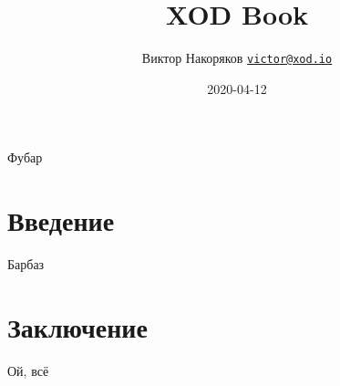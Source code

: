\documentclass[
  fontsize=9pt,
  russian,
]{scrbook}
\title{XOD Book}
\author{Виктор Накоряков
\href{mailto:victor@xod.io}{\nolinkurl{victor@xod.io}}}
\date{2020-04-12}
\begin{document}
\frontmatter
\maketitle


\newenvironment{Note}
  {\begin{shaded}\marginnote{\fbox{?!}}}
  {\end{shaded}}

\newenvironment{Warning}
  {\begin{shaded}\marginnote{\fbox{!!}}}
  {\end{shaded}}

\mainmatter
\chapter{}

Фубар

\chapter{Введение}

Барбаз



\chapter{Заключение}

Ой, всё

\backmatter
\end{document}
